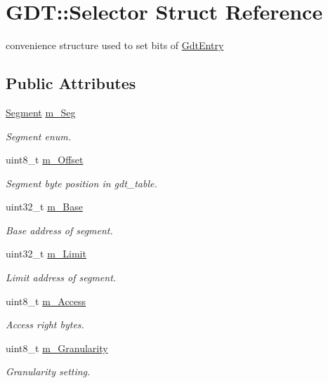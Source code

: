 \hypertarget{struct_g_d_t_1_1_selector}{}\section{G\+DT\+:\+:Selector Struct Reference}
\label{struct_g_d_t_1_1_selector}


convenience structure used to set bits of \hyperlink{union_g_d_t_1_1_gdt_entry}{Gdt\+Entry}  


\subsection*{Public Attributes}
\begin{DoxyCompactItemize}
\item 
\hyperlink{namespace_g_d_t_af2b09941ee46a489ebaccfed5c839154}{Segment} \hyperlink{struct_g_d_t_1_1_selector_a7bff1504d5c83c498334332274bef26d}{m\+\_\+\+Seg}
\begin{DoxyCompactList}\small\item\em Segment enum. \end{DoxyCompactList}\item 
uint8\+\_\+t \hyperlink{struct_g_d_t_1_1_selector_abc557df8df987b1dc2d523156ea0ef85}{m\+\_\+\+Offset}
\begin{DoxyCompactList}\small\item\em Segment byte position in gdt\+\_\+table. \end{DoxyCompactList}\item 
uint32\+\_\+t \hyperlink{struct_g_d_t_1_1_selector_ac98d387038fb7ad18aab22332cb6350c}{m\+\_\+\+Base}
\begin{DoxyCompactList}\small\item\em Base address of segment. \end{DoxyCompactList}\item 
uint32\+\_\+t \hyperlink{struct_g_d_t_1_1_selector_a954aaf8e76a1f1aaaba2a7ca1b558e9f}{m\+\_\+\+Limit}
\begin{DoxyCompactList}\small\item\em Limit address of segment. \end{DoxyCompactList}\item 
uint8\+\_\+t \hyperlink{struct_g_d_t_1_1_selector_aeba15cbab5fa33e66d06b136ece34ed3}{m\+\_\+\+Access}
\begin{DoxyCompactList}\small\item\em Access right bytes. \end{DoxyCompactList}\item 
uint8\+\_\+t \hyperlink{struct_g_d_t_1_1_selector_a7b5d40047c58c483e74a9037418c2203}{m\+\_\+\+Granularity}
\begin{DoxyCompactList}\small\item\em Granularity setting. \end{DoxyCompactList}\end{DoxyCompactItemize}


